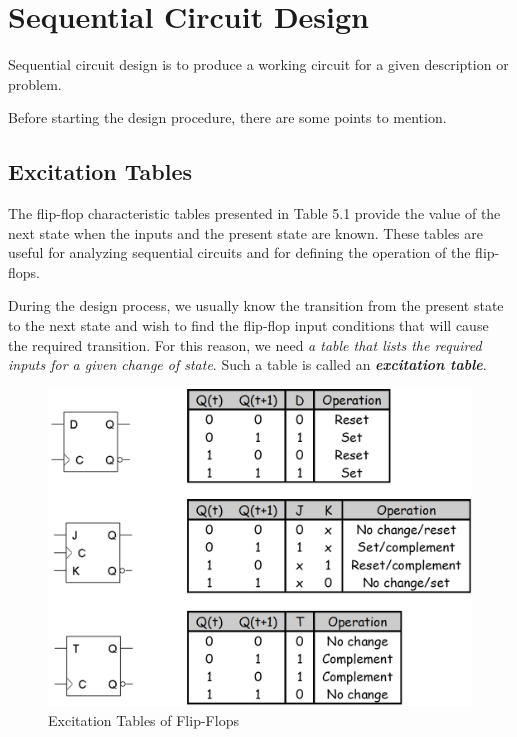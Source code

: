 \section{Sequential Circuit Design}
\label{sec:seq-circ-design}

Sequential circuit design is to produce a working circuit for a given description or problem.

Before starting the design procedure, there are some points to mention.

\subsection{Excitation Tables}

The flip-flop characteristic tables presented in Table 5.1 provide the value of the next state when the inputs and the present state are known. These tables are useful for analyzing sequential circuits and for defining the operation of the flip-flops. 

During the design process, we usually know the transition from the present state to the next state and wish to find the flip-flop input conditions that will cause the required transition. For this reason, we need \textit{a table that lists the required inputs for a given change of state}. Such a table is called an \textit{\textbf{excitation table}}.

\begin{figure}[H]
  \centering
  \includegraphics[width=\linewidth]{img/excitation-tables.png}
  \caption{Excitation Tables of Flip-Flops}
  \label{fig:excitation-tables}
\end{figure}


